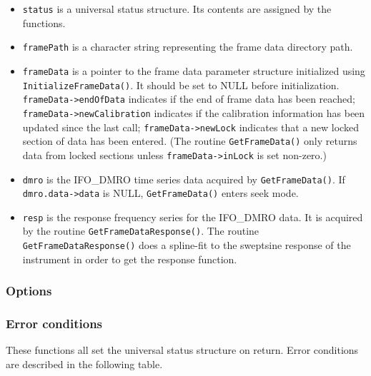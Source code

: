 \documentclass{article}
\begin{document}
\begin{itemize}
\item \texttt{status} is a universal status structure.  Its contents are
assigned by the functions.
\item \texttt{framePath} is a character string representing the frame data
directory path.
\item \texttt{frameData} is a pointer to the frame data parameter structure
initialized using \texttt{InitializeFrameData()}.  It should be set to NULL
before initialization.  \verb+frameData->endOfData+ indicates if
the end of frame data has been reached; \verb+frameData->newCalibration+
indicates if the calibration information has been updated since the last call;
\verb+frameData->newLock+ indicates that a new locked section of data has
been entered.  (The routine \texttt{GetFrameData()} only returns data from
locked sections unless \verb+frameData->inLock+ is set non-zero.)
\item \texttt{dmro} is the IFO\_DMRO time series data acquired by
\texttt{GetFrameData()}.  If \verb+dmro.data->data+ is NULL,
\texttt{GetFrameData()} enters seek mode.
\item \texttt{resp} is the response frequency series for the IFO\_DMRO data.
It is acquired by the routine \texttt{GetFrameDataResponse()}.  The routine
\texttt{GetFrameDataResponse()} does a spline-fit to the sweptsine response of
the instrument in order to get the response function.
\end{itemize}

\subsubsection{Options}

\subsubsection{Error conditions}

These functions all set the universal status structure on return.
Error conditions are described in the following table.
\end{document}
